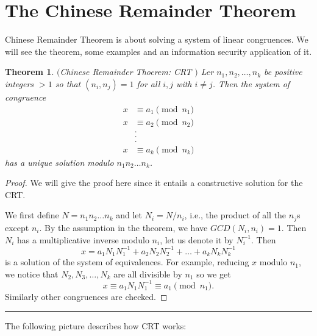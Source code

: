 \documentclass[12pt]{article}
\theoremstyle{plain}
\newtheorem{theorem}{Theorem}
\theoremstyle{definition}
\theoremstyle{remark}
\begin{document}
\section{The Chinese Remainder Theorem}
Chinese Remainder Theorem is about solving a system of linear congruences. We will see the theorem, some examples and an information security application of it.
\begin{theorem} $($Chinese Remainder Thoerem: CRT $)$ \label{CRT} Ler $n_1, n_2, \dots, n_k$ be positive integers $>1$ so that $(n_i,n_j)=1$ for all $i, j$ with $i\neq j$. Then the system of congruence
\begin{align*}
    x &\equiv a_1 \pmod{n_1} \\
    x &\equiv a_2 \pmod{n_2} \\
    &.\\
    &.\\
    &.\\
    x &\equiv a_k \pmod{n_k}
\end{align*}
has a unique solution modulo $n_1n_2\dots n_k$.
\end{theorem}
\begin{proof}
We will give the proof here since it entails a constructive solution for the CRT.

We first define $N=n_1n_2\dots n_k$ and let $N_i=N/n_i$, i.e., the product of all the $n_j$s except $n_i$. By the assumption in the theorem, we have $GCD(N_i, n_i)=1$. Then $N_i$ has a multiplicative inverse modulo $n_i$, let us denote it by $N_i^{-1}$. Then
$$x=a_1N_1N_1^{-1}+a_2N_2N_2^{-1}+\dots +a_kN_kN_k^{-1}$$
is a solution of the system of equivalences. For example, reducing $x$ modulo $n_1$, we notice that $N_2, N_3, \dots, N_k$ are all divisible by $n_1$ so we get
$$x\equiv a_1N_1N_1^{-1} \equiv a_1 \pmod{n_1}. $$ Similarly other congruences are checked.
\end{proof}
\hrule
\medskip

The following picture describes how CRT works:

\bigskip
\end{document}
